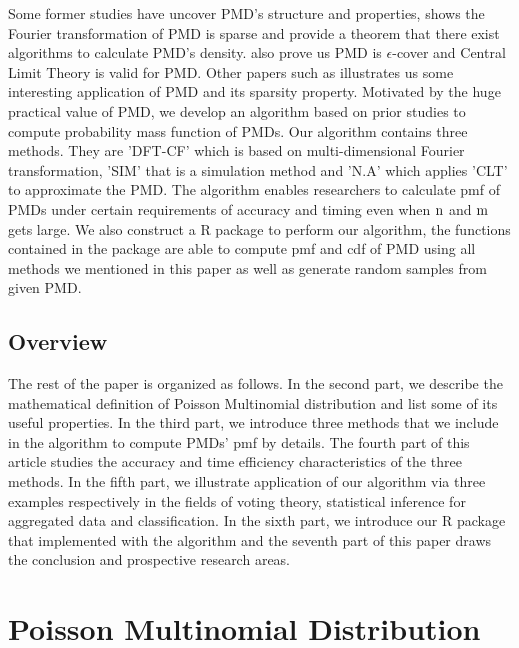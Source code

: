 \documentclass[12pt]{article}
\newcommand{\PMD}{\textrm{PMD}}
\begin{document}


Some former studies have uncover $\PMD$'s structure and properties,  shows the Fourier transformation of $\PMD$ is sparse and provide a theorem that there exist algorithms to calculate PMD's density.  also prove us PMD is $\epsilon$-cover and Central Limit Theory is valid for PMD. Other papers such as  illustrates us some interesting application of PMD and its sparsity property. Motivated by the huge practical value of $\PMD$, we develop an algorithm based on prior studies to compute probability mass function of $\PMD$s. Our algorithm contains three methods. They are 'DFT-CF' which is based on multi-dimensional Fourier transformation, 'SIM' that is a simulation method and 'N.A' which applies 'CLT' to approximate the $\PMD$. The algorithm enables researchers to calculate pmf of $\PMD$s under certain requirements of accuracy and timing even when $\rm n$ and $\rm m$ gets large. We also construct a R package to perform our algorithm, the functions contained in the package are able to compute pmf and cdf of $\PMD$ using all methods we mentioned in this paper as well as generate random samples from given $\PMD$.





\subsection{Overview}
The rest of the paper is organized as follows. In the second part, we describe the mathematical definition of Poisson Multinomial distribution and list some of its useful properties. In the third part, we introduce three methods that we include in the algorithm to compute $\PMD$s' pmf by details. The fourth part of this article studies the accuracy and time efficiency characteristics of the three methods. In the fifth part, we illustrate application of our algorithm via three examples respectively in the fields of voting theory, statistical inference for aggregated data and classification. In the sixth part, we introduce our R package that implemented with the algorithm and the seventh part of this paper draws the conclusion and prospective research areas.




\section{Poisson Multinomial Distribution}
\end{document}
